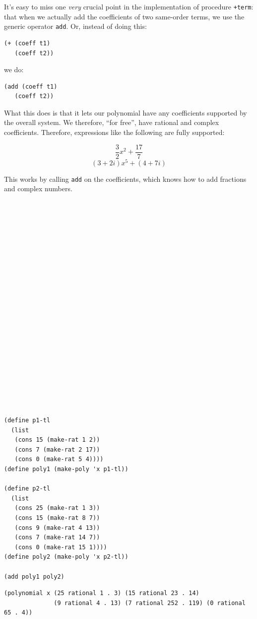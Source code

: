 \documentclass[9pt]{report}
\begin{document}
It's easy to miss one \emph{very} crucial point in the implementation
of procedure \texttt{+term}: that when we actually add the coefficients
of two same-order terms, we use the generic operator \texttt{add}. Or,
instead of doing this:

\begin{verbatim}
(+ (coeff t1)
   (coeff t2))
\end{verbatim}

we do:
\begin{verbatim}
(add (coeff t1)
   (coeff t2))
\end{verbatim}

What this does is that it lets our polynomial have any
coefficients supported by the overall system. We therefore, ``for
free'', have rational and complex coefficients. Therefore,
expressions like the following are fully supported:

$$\frac{3}{2}x^{2} + \frac{17}{7}$$ $$(3+2i)x^5+(4+7i)$$

This works by calling \texttt{add} on the coefficients, which knows how
to add fractions and complex numbers.


\begin{verbatim}






















(define p1-tl
  (list
   (cons 15 (make-rat 1 2))
   (cons 7 (make-rat 2 17))
   (cons 0 (make-rat 5 4))))
(define poly1 (make-poly 'x p1-tl))

(define p2-tl
  (list
   (cons 25 (make-rat 1 3))
   (cons 15 (make-rat 8 7))
   (cons 9 (make-rat 4 13))
   (cons 7 (make-rat 14 7))
   (cons 0 (make-rat 15 1))))
(define poly2 (make-poly 'x p2-tl))

(add poly1 poly2)
\end{verbatim}

\begin{verbatim}
(polynomial x (25 rational 1 . 3) (15 rational 23 . 14)
              (9 rational 4 . 13) (7 rational 252 . 119) (0 rational 65 . 4))
\end{verbatim}
\end{document}
